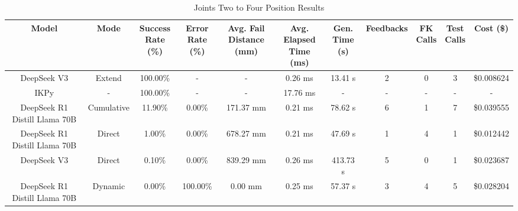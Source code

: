 \begin{landscape}
\begin{table}[H]
\tiny
\renewcommand{\arraystretch}{1.2}
\caption{Joints Two to Four Position Results}
\begin{center}
\begin{tabular}{|c|c|c|c|c|c|c|c|c|c|c|}
    \hline
    \textbf{Model} & 
    \textbf{Mode} & 
    \makecell{\textbf{Success}\\\textbf{Rate (\%)}} &
    \makecell{\textbf{Error}\\\textbf{Rate (\%)}} &
    \makecell{\textbf{Avg. Fail}\\\textbf{Distance (mm)}} &
    \makecell{\textbf{Avg. Elapsed}\\\textbf{Time (ms)}} &
    \makecell{\textbf{Gen.}\\\textbf{Time (s)}} &
    \textbf{Feedbacks} &
    \makecell{\textbf{FK}\\\textbf{Calls}} &
    \makecell{\textbf{Test}\\\textbf{Calls}} &
    \textbf{Cost (\$)} \\
    \hline
    DeepSeek V3 & Extend & 100.00\% & - & - & 0.26 ms & 13.41 s & 2 & 0 & 3 & \$0.008624 \\
    \hline
    IKPy & - & 100.00\% & - & - & 17.76 ms & - & - & - & - & - \\
    \hline
    DeepSeek R1 Distill Llama 70B & Cumulative & 11.90\% & 0.00\% & 171.37 mm & 0.21 ms & 78.62 s & 6 & 1 & 7 & \$0.039555 \\
    \hline
    DeepSeek R1 Distill Llama 70B & Direct & 1.00\% & 0.00\% & 678.27 mm & 0.21 ms & 47.69 s & 1 & 4 & 1 & \$0.012442 \\
    \hline
    DeepSeek V3 & Direct & 0.10\% & 0.00\% & 839.29 mm & 0.26 ms & 413.73 s & 5 & 0 & 1 & \$0.023687 \\
    \hline
    DeepSeek R1 Distill Llama 70B & Dynamic & 0.00\% & 100.00\% & 0.00 mm & 0.25 ms & 57.37 s & 3 & 4 & 5 & \$0.028204 \\
    \hline
\end{tabular}
\label{Results-Position-2-4}
\end{center}
\end{table}


\end{landscape}

